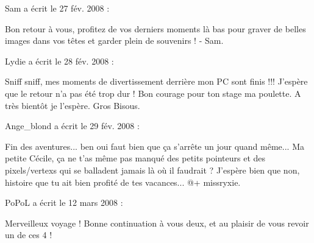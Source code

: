 \medskip
Sam a écrit le 27 fév. 2008 :
\begin{displayquote}
Bon retour à vous, profitez de vos derniers moments là bas pour graver de belles images dans vos têtes et garder plein de souvenirs !
- Sam.
\end{displayquote}

\medskip
Lydie a écrit le 28 fév. 2008 :
\begin{displayquote}
Sniff sniff, mes moments de divertissement derrière mon PC sont finis !!!
J'espère que le retour n'a pas été trop dur !
Bon courage pour ton stage ma poulette.
A très bientôt je l'espère.
Gros Bisous.
\end{displayquote}

\medskip
Ange\_blond a écrit le 29 fév. 2008 :
\begin{displayquote}
Fin des aventures... ben oui faut bien que ça s'arrête un jour quand même...
Ma petite Cécile, ça ne t'as même pas manqué des petits pointeurs et des pixels/vertexs qui se balladent jamais là où il faudrait ?
J'espère bien que non, histoire que tu ait bien profité de tes vacances...
@+ missryxie.
\end{displayquote}

\medskip
PoPoL a écrit le 12 mars 2008 :
\begin{displayquote}
Merveilleux voyage ! Bonne continuation à vous deux, et au plaisir de vous revoir un de ces 4 !
\end{displayquote}

\vfill

